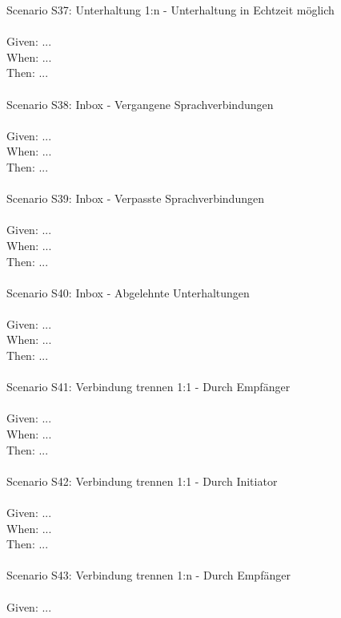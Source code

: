 \begin{tabbing}
    Scenario S37: \> \> \> Unterhaltung 1:n - Unterhaltung in Echtzeit möglich \\ \\
    Given:  \> \> \> ...\\
    When:   \> \> \> ...\\
    Then:   \> \> \> ...\\
    \\
    Scenario S38: \> \> \> Inbox - Vergangene Sprachverbindungen \\ \\
    Given:  \> \> \> ...\\
    When:   \> \> \> ...\\
    Then:   \> \> \> ...\\
    \\
    Scenario S39: \> \> \> Inbox - Verpasste Sprachverbindungen \\ \\
    Given:  \> \> \> ...\\
    When:   \> \> \> ...\\
    Then:   \> \> \> ...\\
    \\
    Scenario S40: \> \> \> Inbox - Abgelehnte Unterhaltungen \\ \\
    Given:  \> \> \> ...\\
    When:   \> \> \> ...\\
    Then:   \> \> \> ...\\
    \\
    Scenario S41: \> \> \> Verbindung trennen 1:1 - Durch Empfänger \\ \\
    Given:  \> \> \> ...\\
    When:   \> \> \> ...\\
    Then:   \> \> \> ...\\
    \\
    Scenario S42: \> \> \> Verbindung trennen 1:1 - Durch Initiator \\ \\
    Given:  \> \> \> ...\\
    When:   \> \> \> ...\\
    Then:   \> \> \> ...\\
    \\
    Scenario S43: \> \> \> Verbindung trennen 1:n - Durch Empfänger \\ \\
    Given:  \> \> \> ...\\

\end{tabbing}
